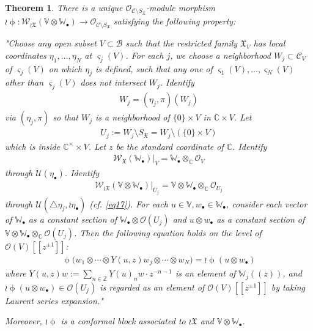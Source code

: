 \documentclass[12pt,a4paper,notitlepage]{article}
\theoremstyle{definition}
\theoremstyle{plain}
\newtheorem{thm}[df]{Theorem}
\newcommand{\fk}{\mathfrak}
\newcommand{\mc}{\mathcal}
\newcommand{\scr}{\mathscr}
\newcommand{\sgm}{\varsigma}
\newcommand{\SX}{{S_{\fk X}}}
\newcommand{\blt}{\bullet}
\newcommand{\Vbb}{\mathbb V}
\newcommand{\Wbb}{\mathbb W}
\newcommand{\Cbb}{\mathbb C}
\newcommand{\Zbb}{\mathbb Z}
\numberwithin{equation}{section}
\begin{document}
\begin{thm}\label{lb4}
There is a unique $\scr O_{\mc C\setminus\SX}$-module morphism $\wr\upphi:\scr W_{\wr\fk X}(\Vbb\otimes\Wbb_\blt)\rightarrow\scr O_{\mc C\setminus\SX}$ satisfying the  following property: 

"Choose any open subset $V\subset\mc B$  such that the restricted family $\fk X_V$ has local coordinates $\eta_1,\dots,\eta_N$ at $\sgm_j(V)$. For each $j$, we choose a neighborhood $W_j\subset\mc C_V$ of $\sgm_j(V)$ on which $\eta_j$ is defined, such that  any one of $\sgm_1(V),\dots,\sgm_N(V)$ other than $\sgm_j(V)$ does not intersect $W_j$. Identify 
\begin{align*}
W_j=(\eta_j,\pi)(W_j)	
\end{align*}
via $(\eta_j,\pi)$ so that $W_j$ is a neighborhood of $\{0\}\times V$ in $\Cbb\times V$. Let
\begin{align*}
U_j:=W_j\setminus\SX=W_j\setminus(\{0\}\times V)	
\end{align*}
which is inside $\Cbb^\times\times V$. Let $z$ be the standard coordinate of $\Cbb$. Identify
\begin{align*}
\scr W_{\fk X}(\Wbb_\blt)\big|_V=\Wbb_\blt\otimes_\Cbb\scr O_V	
\end{align*}
through $\mc U(\eta_\blt)$. Identify 
\begin{align}
\scr W_{\wr\fk X}(\Vbb\otimes\Wbb_\blt)\big|_{U_j}=\Vbb\otimes\Wbb_\blt\otimes_\Cbb\scr O_{U_j}\label{eq25}	
\end{align}
through $\mc U(\triangle\eta_j,\wr\eta_\blt)$ (cf. \eqref{eq17}). For each $u\in\Vbb,w_\blt\in\Wbb_\blt$, consider each vector of $\Wbb_\blt$ as a constant section of $\Wbb_\blt\otimes\scr O(U_j)$ and  $u\otimes w_\blt$ as a constant section of $\Vbb\otimes\Wbb_\blt\otimes_\Cbb\scr O(U_j)$. Then the following equation holds on the level of $\scr O(V)[[z^{\pm 1}]]$:
\begin{align}
\boxed{~\upphi\big(w_1\otimes\cdots\otimes Y(u,z)w_j\otimes\cdots\otimes w_N\big)=\wr\upphi(u\otimes w_\blt)~}\label{eq18}
\end{align}
where $Y(u,z)w:=\sum_{n\in\Zbb}Y(u)_nw\cdot z^{-n-1}$  is an element of $\Wbb_j((z))$, and  $\wr\upphi(u\otimes w_\blt)\in \scr O(U_j)$ is regarded as an element of $\scr O(V)[[z^{\pm 1}]]$ by taking Laurent series expansion."

Moreover, $\wr\upphi$ is a conformal block associated to $\wr\fk X$ and $\Vbb\otimes\Wbb_\blt$.
\end{thm}
\end{document}
